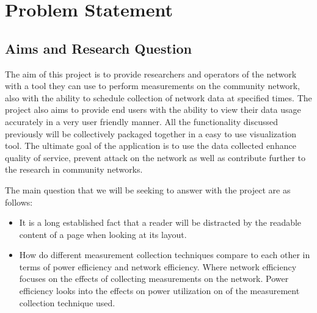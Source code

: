 \section{Problem Statement}
\subsection{Aims and Research Question}
The aim of this project is to provide researchers and operators of the network with a tool they can use to perform measurements on the community network, also with the ability to schedule collection of network data at specified times. The project also aims to provide end users with the ability to view their data usage accurately in a very user friendly manner. All the functionality discussed previously will be collectively packaged together in a easy to use visualization tool. The ultimate goal of the application is to use the data collected enhance quality of service, prevent attack on the network as well as contribute further to the research in community networks.

The main question that we will be seeking to answer with the project are as follows:
\begin{itemize}
	\item It is a long established fact that a reader will be distracted by the readable content of a page when looking at its layout. 
	\item How do different measurement collection techniques compare to each other in terms of power efficiency and network efficiency. Where network efficiency focuses on the effects of collecting measurements on the network. Power efficiency looks into the effects on power utilization on of the measurement collection technique used.
\end{itemize}

